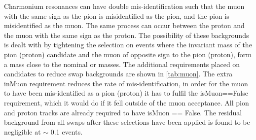 Charmonium resonances can have double mis-identification such that the muon with the same sign as the pion is misidentified as the pion, and the pion is misidentified as the muon. The same process can occur between the proton and the muon with the same sign as the proton. The possibility of these backgrounds is dealt with by tightening the selection on events where the invariant mass of the pion (proton) candidate and the muon of opposite sign to the pion (proton), form a mass close to the nominal \jpsi or \psitwos masses. The additional requirements placed on \Lbpi candidates to reduce swap backgrounds are shown in \autoref{tab:muon}. The extra \gls{inMuon} requirement reduces the rate of mis-identification, in order for the muon to have been mis-identified as a pion (proton) it has to fulfil the isMuon==False requirement, which it would do if it fell outside of the muon acceptance.  All pion and proton tracks are already required to have isMuon == False. The residual background from all swaps after these selections have been applied is found to be negligible at $\sim$ 0.1 events.



